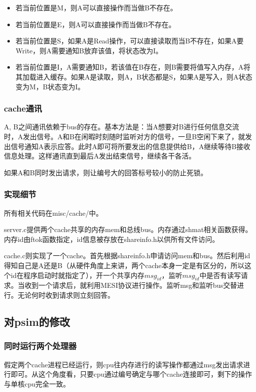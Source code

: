 \documentclass{article}
\theoremstyle{plain} \newtheorem{theorem}{常识}[section]
\theoremstyle{plain} \newtheorem{lizi}{例}[section]
\begin{document}
\begin{itemize}
    \item 若当前位置是M，则A可以直接操作而当做B不存在。
    \item 若当前位置是E，则A可以直接操作而当做B不存在。
    \item 若当前位置是S，如果A是Read操作，可以直接读取而当B不存在，如果A要Write，则A需要通知B放弃该值，将状态改为I。
    \item 若当前位置是I，A需要通知B，若该值在B存在，则B需要将值写入内存，A将其加载进入缓存。如果A是读取，则A，B状态都是S，如果A是写入，则A状态变为M，B状态变为I。
\end{itemize}

\subsubsection{cache通讯}
A, B之间通讯依赖于bus的存在。基本方法是：当A想要对B进行任何信息交流时，A发出信号。A和B在闲暇时刻随时监听对方的信号，一旦B空闲下来了，就发出信号通知A表示应答。此时A即可将所要发出的信息提供给B，A继续等待B接收信息处理。这样通讯直到最后A发出结束信号，继续各干各活。

如果A和B同时发出请求，则让编号大的回答标号较小的防止死锁。

\subsubsection{实现细节}
所有相关代码在misc/cache/中。

server.c提供两个cache共享的内存mem和总线bus。内存通过shmat相关函数获得。内存id由ftok函数指定，id信息被存放在shareinfo.h以供所有文件访问。

cache.c则实现了一个cache。首先根据shareinfo.h申请访问mem和bus。然后利用id得知自己是A还是B（从硬件角度上来讲，两个cache本身一定是有区分的，所以这个id在程序启动时就指定了），开一个共享内存$msg_{id}$，监听$msg_{id}$中是否有读写请求。当收到一个请求后，就利用MESI协议进行操作。监听msg和监听bus交替进行。无论何时收到请求则立刻回答。

\subsection{对psim的修改}
\subsubsection{同时运行两个处理器}
假定两个cache进程已经运行，则cpu往内存进行的读写操作都通过msg发出请求进行即可。从这个角度看，只要cpu通过编号确定与哪个cache连接即可，剩下的操作与单核cpu完全一致。
\end{document}
